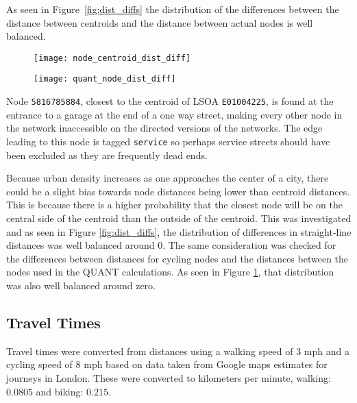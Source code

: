 As seen in Figure~\ref{fig:dist_diffs} the distribution of the differences between the distance between centroids and the distance between actual nodes is well balanced. 

\begin{figure}
\centering
\begin{minipage}{.5\textwidth}
  \centering
  \texttt{[image: node\_centroid\_dist\_diff]}
  \label{fig:dist_diffs}
\end{minipage}%
\begin{minipage}{.5\textwidth}
  \centering
  \texttt{[image: quant\_node\_dist\_diff]}
  \label{fig:quant_dist_diffs}
\end{minipage}
\end{figure}

Node \texttt{5816785884}, closest to the centroid of LSOA \texttt{E01004225}, is found at the entrance to a garage at the end of a one way street, making every other node in the network inaccessible on the directed versions of the networks. The edge leading to this node is tagged \texttt{service} so perhaps service streets should have been excluded as they are frequently dead ends. 

Because urban density increases as one approaches the center of a city, there could be a slight bias towards node distances being lower than centroid distances. This is because there is a higher probability that the closest node will be on the central side of the centroid than the outside of the centroid. This was investigated and as seen in Figure \ref{fig:dist_diffs}, the distribution of differences in straight-line distances was well balanced around 0. The same consideration was checked for the differences between distances for cycling nodes and the distances between the nodes used in the QUANT calculations. As seen in Figure \ref{fig:quant_dist_diffs}, that distribution was also well balanced around zero. 

\subsection{Travel Times}

Travel times were converted from distances using a walking speed of 3 mph and a cycling speed of 8 mph based on data taken from Google maps estimates for journeys in London. These were converted to kilometers per minute, walking: $0.0805$ and biking: $0.215$. 

